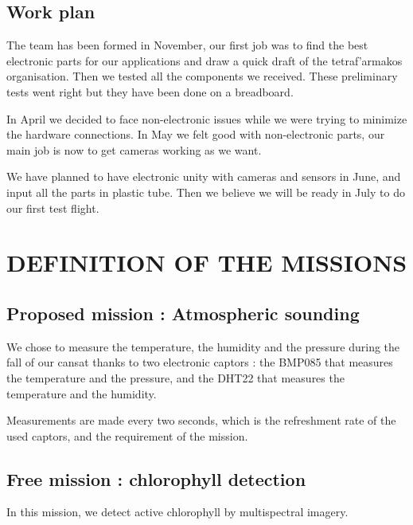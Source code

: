 \documentclass[twocolumn,10pt]{article}
\newcommand\tet{\textgreek{tetraf'armakos} }
\begin{document}
    \subsection{Work plan}%
    \par The team has been formed in November, our first job was to find the best electronic parts for our applications and draw a quick draft of the \tet organisation. Then we tested all the components we received. These preliminary tests went right but they have been done on a breadboard. 
    
    \par In April we decided to face non-electronic issues while we were trying to minimize the hardware connections. In May we felt good with non-electronic parts, our main job is now to get cameras working as we want.
    
    \par We have planned to have electronic unity with cameras and sensors in June, and input all the parts in plastic tube. Then we believe we will be ready in July to do our first test flight.
    
\section{DEFINITION OF THE MISSIONS}%
    \subsection{Proposed mission : Atmospheric sounding}%
        \par We chose to measure the temperature, the humidity and the pressure during the fall of our cansat thanks to two electronic captors : the BMP085 that measures the temperature and the pressure, and the DHT22 that measures the temperature and the humidity.
        \par Measurements are made every two seconds, which is the refreshment rate of the used captors, and the requirement of the mission.
    \subsection{Free mission : chlorophyll detection}%
        \par In this mission, we detect active chlorophyll by multispectral imagery.
\end{document}
